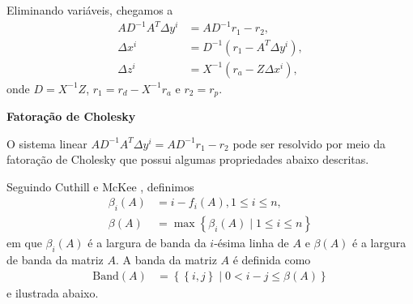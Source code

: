 \documentclass[]{beamer}
\begin{document}
\begin{frame}[t,fragile]
\begin{columns}[t]
\begin{column}{0.4\textwidth}
      Eliminando variáveis, chegamos a
      \begin{align*}
          A D^{-1} A^T \Delta y^i &= A D^{-1} r_1 - r_2, \\
          \Delta x^i &= D^{-1} \left( r_1 - A^T \Delta y^i \right), \\
          \Delta z^i &= X^{-1} \left( r_a - Z \Delta x^i \right),
      \end{align*}
      onde $D = X^{-1} Z$, $r_1 = r_d - X^{-1} r_a$ e $r_2 = r_p$.

      \textbf{Fatoração de Cholesky}

      O sistema linear $A D^{-1} A^T \Delta y^i = A D^{-1} r_1 - r_2$ pode ser
      resolvido por meio da fatoração de Cholesky que possui algumas
      propriedades abaixo descritas.

      Seguindo Cuthill e McKee \nocite{Cuthill:1969:ReducingBandwidth}, definimos
      \begin{align*}
          \beta_i(A) &= i - f_i(A), 1 \leq i \leq n, \\
          \beta(A) &= \max\left\{ \beta_i(A) \mid 1 \leq i \leq n \right\}
      \end{align*}
      em que $\beta_i(A)$ é a largura de banda da $i$-ésima linha de $A$ e
      $\beta(A)$ é a largura de banda da matriz $A$. A banda da matriz $A$ é
      definida como
      \begin{align*}
          \text{Band}(A) &= \left\{ \left\{ i, j \right\} \mid 0 < i - j \leq
          \beta(A) \right\}
      \end{align*}
      e ilustrada abaixo.
      \begin{figure}[!htb]
          \centering
\end{figure}
\end{column}
\end{columns}
\end{frame}
\end{document}
